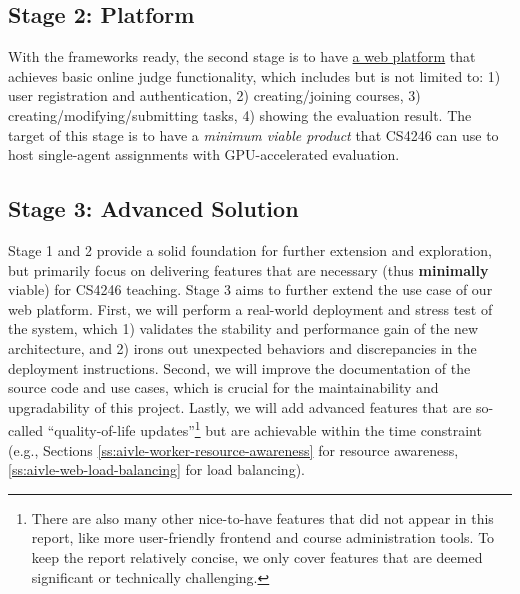 \subsection{Stage 2: Platform}
With the frameworks ready, the second stage is to have \hyperref[ch:aivle-web]{a web platform} that achieves basic online judge functionality, which includes but is not limited to: 1) user registration and authentication, 2) creating/joining courses, 3) creating/modifying/submitting tasks, 4) showing the evaluation result. The target of this stage is to have a \emph{minimum viable product} that CS4246 can use to host single-agent assignments with GPU-accelerated evaluation.

\subsection{Stage 3: Advanced Solution}
Stage 1 and 2 provide a solid foundation for further extension and exploration, but primarily focus on delivering features that are necessary (thus \textbf{minimally} viable) for CS4246 teaching. Stage 3 aims to further extend the use case of our web platform. First, we will perform a real-world deployment and stress test of the system, which 1) validates the stability and performance gain of the new architecture, and 2) irons out unexpected behaviors and discrepancies in the deployment instructions. Second, we will improve the documentation of the source code and use cases, which is crucial for the maintainability and upgradability of this project. Lastly, we will add advanced features that are so-called ``quality-of-life updates''\footnote{There are also many other nice-to-have features that did not appear in this report, like more user-friendly frontend and course administration tools. To keep the report relatively concise, we only cover features that are deemed significant or technically challenging.} but are achievable within the time constraint (e.g., Sections \ref{ss:aivle-worker-resource-awareness} for resource awareness, \ref{ss:aivle-web-load-balancing} for load balancing).
